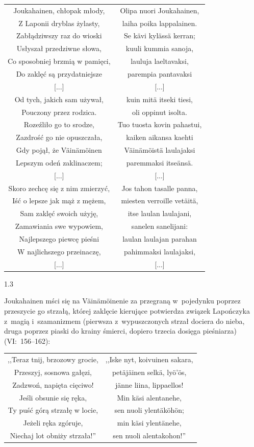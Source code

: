 \documentclass[11pt,a4paper,twoside]{report}
\begin{document}
{\centering
\small
\begin{longtable}{c c}
Joukahainen, chłopak młody, & Olipa nuori Joukahainen, \\
Z Laponii dryblas żylasty, & laiha poika lappalainen. \\
Zabłądziwszy raz do wioski & Se kävi kylässä kerran; \\
Usłyszał przedziwne słowa, & kuuli kummia sanoja, \\
Co sposobniej brzmią w pamięci, & lauluja laeltavaksi, \\
Do zaklęć są przydatniejsze & parempia pantavaksi \\
{[...]}  &  {[...]}\\
Od tych, jakich sam używał, & kuin mitä itseki tiesi, \\
Pouczony przez rodzica. & oli oppinut isolta. \\
Rozeźliło go to srodze, & Tuo tuosta kovin pahastui, \\
Zazdrość go nie opuszczała, & kaiken aikansa kaehti \\
Gdy pojął, że Väinämöinen & Väinämöistä laulajaksi \\
Lepszym odeń zaklinaczem; & paremmaksi itseänsä. \\
{[...]}  &  {[...]}\\
Skoro zechcę się z nim zmierzyć, & Jos tahon tasalle panna, \\
Iść o lepsze jak mąż z mężem, & miesten verroille vetäitä, \\
Sam zaklęć swoich użyję, & itse laulan laulajani, \\
Zamawiania swe wypowiem, & sanelen sanelijani: \\
Najlepszego piewcę pieśni & laulan laulajan parahan \\
W najlichszego przeinaczę, & pahimmaksi laulajaksi, \\
{[...]}  &  {[...]}\\
\end{longtable}
}
\begin{spacing}{1.3}

Joukahainen mści się na Väinämöinenie za przegraną w~pojedynku poprzez przeszycie go strzałą, której zaklęcie kierujące potwierdza związek Lapończyka z~magią i~szamanizmem (pierwsza z~wypuszczonych strzał dociera do nieba, druga poprzez piaski do krainy śmierci, dopiero trzecia dosięga pieśniarza)  (VI:~156--162):
\end{spacing}
\newpage
{\centering
\small
\begin{longtable}{c c}
,,Teraz tnij, brzozowy grocie, & ,,Iske nyt, koivuinen sakara, \\
Przeszyj, sosnowa gałęzi, & petäjäinen selkä, lyö'ös, \\
Zadzwoń, napięta cięciwo! & jänne liina, lippaellos! \\
Jeśli obsunie się ręka, & Min käsi alentanehe, \\
Ty puść górą strzałę w locie, & sen nuoli ylentäköhön; \\
Jeżeli ręka zgóruje, & min käsi ylentänehe, \\
Niechaj lot obniży strzała!'' & sen nuoli alentakohon!'' \\
\end{longtable}
}
\end{document}
